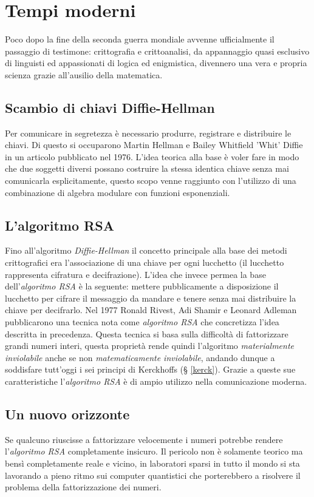 \documentclass[a4paper, 12pt]{article}
\begin{document}
\section{Tempi moderni}
Poco dopo la fine della seconda guerra mondiale avvenne ufficialmente il passaggio di testimone: crittografia e crittoanalisi, da appannaggio quasi esclusivo di linguisti ed appassionati di logica ed enigmistica, divennero una vera e propria scienza grazie all'ausilio della matematica.
\subsection{Scambio di chiavi Diffie-Hellman}
Per comunicare in segretezza è necessario produrre, registrare e distribuire le chiavi. Di questo si occuparono Martin Hellman e Bailey Whitfield 'Whit' Diffie in un articolo pubblicato nel 1976. L'idea teorica alla base è voler fare in modo che due soggetti diversi possano costruire la stessa identica chiave senza mai comunicarla esplicitamente, questo scopo venne raggiunto con l'utilizzo di una combinazione di algebra modulare con funzioni esponenziali.
\subsection{L'algoritmo RSA}
Fino all'algoritmo \textit{Diffie-Hellman} il concetto principale alla base dei metodi crittografici era l'associazione di una chiave per ogni lucchetto (il lucchetto rappresenta cifratura e decifrazione). L'idea che invece permea la base dell'\textit{algoritmo RSA} è la seguente: mettere pubblicamente a disposizione il lucchetto per cifrare il messaggio da mandare e tenere senza mai distribuire la chiave per decifrarlo.\newline
Nel 1977 Ronald Rivest, Adi Shamir e Leonard Adleman pubblicarono una tecnica nota come \textit{algoritmo RSA} che concretizza l'idea descritta in precedenza. Questa tecnica si basa sulla difficoltà di fattorizzare grandi numeri interi, questa proprietà rende quindi l'algoritmo \textit{materialmente inviolabile} anche se non \textit{matematicamente inviolabile}, andando dunque a soddisfare tutt'oggi i sei principi di Kerckhoffs (\S{} \ref{kerck}).
Grazie a queste sue caratteristiche l'\textit{algoritmo RSA} è di ampio utilizzo nella comunicazione moderna.
\subsection{Un nuovo orizzonte}
Se qualcuno riuscisse a fattorizzare velocemente i numeri potrebbe rendere l'\textit{algoritmo RSA} completamente insicuro.\newline
Il pericolo non è solamente teorico ma bensì completamente reale e vicino, in laboratori sparsi in tutto il mondo si sta lavorando a pieno ritmo sui computer quantistici che porterebbero a risolvere il problema della fattorizzazione dei numeri.
\end{document}
